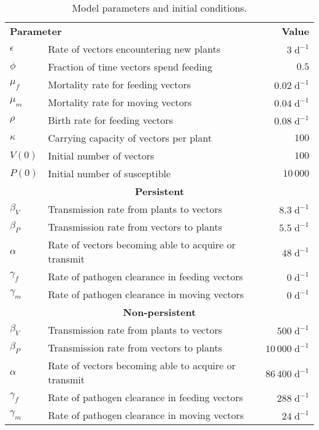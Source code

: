 \documentclass{article}
\begin{document}
\begin{table}
  \centering
  \begin{tabular}{llr}
    \multicolumn{2}{l}{\textbf{Parameter}}
    & \multicolumn{1}{r}{\textbf{Value}}
    \\
    $\epsilon$ & Rate of vectors encountering new plants & $3\;\text{d}^{-1}$
    \\
    $\phi$ & Fraction of time vectors spend feeding & $0.5$
    \\
    $\mu_f$ & Mortality rate for feeding vectors & $0.02\;\text{d}^{-1}$
    \\
    $\mu_m$ & Mortality rate for moving vectors & $0.04\;\text{d}^{-1}$
    \\
    $\rho$ & Birth rate for feeding vectors & $0.08\;\text{d}^{-1}$
    \\
    $\kappa$ & Carrying capacity of vectors per plant & $100$
    \\
    $V(0)$ & Initial number of vectors & $100$
    \\
    $P(0)$ & Initial number of susceptible & $10\,000$
    \\
    \multicolumn{3}{c}{\textbf{Persistent}}
    \\
    $\beta_V$ & Transmission rate from plants to vectors & $8.3\;\text{d}^{-1}$
    \\
    $\beta_P$ & Transmission rate from vectors to plants & $5.5\;\text{d}^{-1}$
    \\
    $\alpha$ & Rate of vectors becoming able to acquire or transmit & $48\;\text{d}^{-1}$
    \\
    $\gamma_f$ & Rate of pathogen clearance in feeding vectors & $0\;\text{d}^{-1}$
    \\
    $\gamma_m$ & Rate of pathogen clearance in moving vectors & $0\;\text{d}^{-1}$
    \\
    \multicolumn{3}{c}{\textbf{Non-persistent}}
    \\
    $\beta_V$ & Transmission rate from plants to vectors & $500\;\text{d}^{-1}$
    \\
    $\beta_P$ & Transmission rate from vectors to plants & $10\,000\;\text{d}^{-1}$
    \\
    $\alpha$ & Rate of vectors becoming able to acquire or transmit & $86\,400\;\text{d}^{-1}$
    \\
    $\gamma_f$ & Rate of pathogen clearance in feeding vectors & $288\;\text{d}^{-1}$ \\
    $\gamma_m$ & Rate of pathogen clearance in moving vectors & $24\;\text{d}^{-1}$
  \end{tabular}
  \caption{Model parameters and initial conditions.}
  \label{params}
\end{table}
\end{document}
